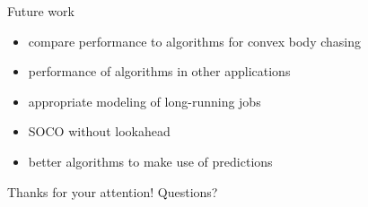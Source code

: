 \documentclass{beamer}
\begin{document}
\begin{frame}{Future work}
\begin{itemize}
    \item compare performance to algorithms for convex body chasing\pause
    \item performance of algorithms in other applications\pause
    \item appropriate modeling of long-running jobs\pause
    \item SOCO without lookahead\pause
    \item better algorithms to make use of predictions
\end{itemize}
\end{frame}

\begin{frame}
\centering \large
Thanks for your attention!
Questions?
\end{frame}

\end{document}
